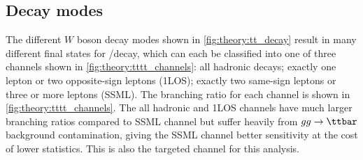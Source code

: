 \documentclass[../thesis.tex]{subfiles}
\begin{document}

\subsection{Decay modes}

The different $W$ boson decay modes shown in \autoref{fig:theory:tt_decay} result in many different final states for \ttZp/\tttt decay, which can each be classified into one of three channels shown in \autoref{fig:theory:tttt_channels}: all hadronic decays; exactly one lepton or two opposite-sign leptons (\acs{1LOS}); exactly two same-sign leptons or three or more leptons (\acs{SSML}). The branching ratio for each channel is shown in \autoref{fig:theory:tttt_channels}. The all hadronic and \acs{1LOS} channels have much larger branching ratios compared to \acs{SSML} channel but suffer heavily from $gg\rightarrow\ttbar$ background contamination, giving the \acs{SSML} channel better sensitivity at the cost of lower statistics. This is also the targeted channel for this analysis.
\end{document}
